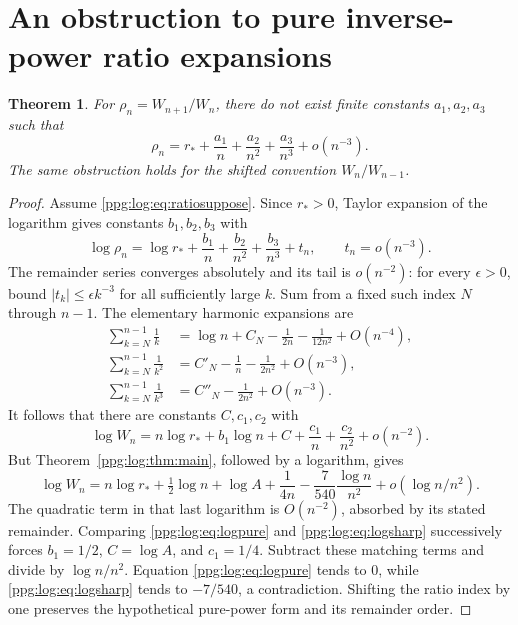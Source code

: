\documentclass[11pt,letterpaper]{article}
\newtheorem{theorem}{Theorem}[section]
\theoremstyle{remark}\newtheorem{remark}[theorem]{Remark}
\numberwithin{equation}{section}
\begin{document}
\section{An obstruction to pure inverse-power ratio expansions}\label{ppg:log:sec:ratio}
\begin{theorem}\label{ppg:log:thm:ratio}
For $\rho_n=W_{n+1}/W_n$, there do not exist finite constants $a_1,a_2,a_3$ such that
\begin{equation}\label{ppg:log:eq:ratiosuppose}
 \rho_n=r_*+\frac{a_1}{n}+\frac{a_2}{n^2}+\frac{a_3}{n^3}+o(n^{-3}).
\end{equation}
The same obstruction holds for the shifted convention $W_n/W_{n-1}$.
\end{theorem}
\begin{proof}
Assume \eqref{ppg:log:eq:ratiosuppose}. Since $r_*>0$, Taylor expansion of the logarithm gives constants $b_1,b_2,b_3$ with
\[
 \log\rho_n=\log r_*+\frac{b_1}{n}+\frac{b_2}{n^2}
                    +\frac{b_3}{n^3}+t_n,\qquad t_n=o(n^{-3}).
\]
The remainder series converges absolutely and its tail is $o(n^{-2})$: for every $\epsilon>0$, bound $|t_k|\le\epsilon k^{-3}$ for all sufficiently large $k$. Sum from a fixed such index $N$ through $n-1$. The elementary harmonic expansions are
\begin{align*}
 \sum_{k=N}^{n-1}\frac1k&=\log n+C_N-\frac1{2n}-\frac1{12n^2}+O(n^{-4}),\\
 \sum_{k=N}^{n-1}\frac1{k^2}&=C'_N-\frac1n-\frac1{2n^2}+O(n^{-3}),\\
 \sum_{k=N}^{n-1}\frac1{k^3}&=C''_N-\frac1{2n^2}+O(n^{-3}).
\end{align*}
It follows that there are constants $C,c_1,c_2$ with
\begin{equation}\label{ppg:log:eq:logpure}
 \log W_n=n\log r_*+b_1\log n+C+\frac{c_1}{n}
                             +\frac{c_2}{n^2}+o(n^{-2}).
\end{equation}
But Theorem~\ref{ppg:log:thm:main}, followed by a logarithm, gives
\begin{equation}\label{ppg:log:eq:logsharp}
 \log W_n=n\log r_*+\tfrac12\log n+\log A+\frac1{4n}
  -\frac7{540}\frac{\log n}{n^2}+o(\log n/n^2).
\end{equation}
The quadratic term in that last logarithm is $O(n^{-2})$, absorbed by its stated remainder. Comparing \eqref{ppg:log:eq:logpure} and \eqref{ppg:log:eq:logsharp} successively forces $b_1=1/2$, $C=\log A$, and $c_1=1/4$. Subtract these matching terms and divide by $\log n/n^2$. Equation \eqref{ppg:log:eq:logpure} tends to 0, while \eqref{ppg:log:eq:logsharp} tends to $-7/540$, a contradiction. Shifting the ratio index by one preserves the hypothetical pure-power form and its remainder order.
\end{proof}
\end{document}
